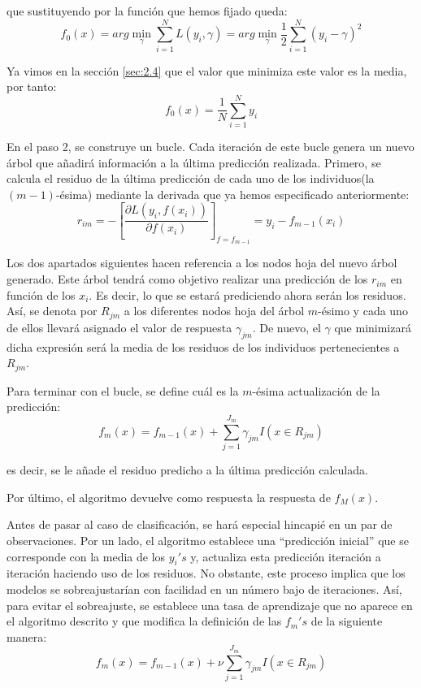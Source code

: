 \documentclass[12pt,twoside]{article}
\begin{document}
\noindent
que sustituyendo por la función que hemos fijado queda:
\begin{equation*}
f_0(x) = arg\min_{\gamma} \sum_{i=1}^N L(y_i, \gamma) = arg\min_{\gamma} \frac{1}{2}\sum_{i=1}^N (y_i - \gamma)^2 
\end{equation*}

Ya vimos en la sección \ref{sec:2.4} que el valor que minimiza este valor es la media, por tanto:
\begin{equation*}
f_0(x) = \frac{1}{N} \sum_{i=1}^N y_i
\end{equation*}

En el paso 2, se construye un bucle. Cada iteración de este bucle genera un nuevo árbol que añadirá información a la última predicción realizada. Primero, se calcula el residuo de la última predicción de cada uno de los individuos(la $(m-1)$-ésima) mediante la derivada que ya hemos especificado anteriormente:
\begin{equation*}
r_{im} = - \left[ \frac{\partial L(y_i, f(x_i))}{\partial f(x_i)} \right]_{f = f_{m-1}} = y_i -f_{m-1}(x_i)
\end{equation*}

Los dos apartados siguientes hacen referencia a los nodos hoja del nuevo árbol generado. Este árbol tendrá como objetivo realizar una predicción de los $r_{im}$ en función de los $x_i$. Es decir, lo que se estará prediciendo ahora serán los residuos. Así, se denota por $R_{jm}$ a los diferentes nodos hoja del árbol $m$-ésimo y cada uno de ellos llevará asignado el valor de respuesta $\gamma_{jm}$. De nuevo, el $\gamma$ que minimizará dicha expresión será la media de los residuos de los individuos pertenecientes a $R_{jm}$. 

Para terminar con el bucle, se define cuál es la $m$-ésima actualización de la predicción:
\begin{equation*}
f_m(x) = f_{m-1}(x) + \sum_{j = 1}^{J_m}\gamma_{jm} I(x \in R_{jm})
\end{equation*}

\noindent
es decir, se le añade el residuo predicho a la última predicción calculada.

Por último, el algoritmo devuelve como respuesta la respuesta de $f_M(x)$.

Antes de pasar al caso de clasificación, se hará especial hincapié en un par de observaciones. Por un lado, el algoritmo establece una ``predicción inicial'' que se corresponde con la media de los $y_i's$ y, actualiza esta predicción iteración a iteración haciendo uso de los residuos. No obstante, este proceso implica que los modelos se sobreajustarían con facilidad en un número bajo de iteraciones. Así, para evitar el sobreajuste, se establece una tasa de aprendizaje que no aparece en el algoritmo descrito y que modifica la definición de las $f_m's$ de la siguiente manera:
\begin{equation*}
f_m(x) = f_{m-1}(x) + \nu \sum_{j = 1}^{J_m}\gamma_{jm} I(x \in R_{jm})
\end{equation*}
\end{document}
